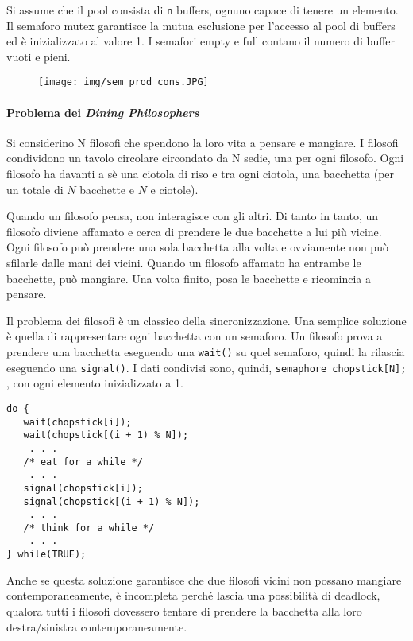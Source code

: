 \documentclass[a4]{article}
\begin{document}
Si assume che il pool consista di \texttt n buffers, ognuno capace di tenere un elemento. Il semaforo mutex garantisce la mutua esclusione per l'accesso al pool di buffers ed è inizializzato al valore 1. I semafori empty e full contano il numero di buffer vuoti e pieni.
\begin{figure}[h!]
    \texttt{[image: img/sem\_prod\_cons.JPG]}
\end{figure}

\paragraph{Problema dei \textit{Dining Philosophers}}

Si considerino N filosofi che spendono la loro vita a pensare e mangiare. I filosofi condividono un tavolo circolare circondato da N sedie, una per ogni filosofo. Ogni filosofo ha davanti a sè una ciotola di riso e tra ogni ciotola, una bacchetta (per un totale di $N$ bacchette e $N$ e ciotole).

Quando un filosofo pensa, non interagisce con gli altri. Di tanto in tanto, un filosofo diviene affamato e cerca di prendere le due bacchette a lui più vicine. Ogni filosofo può prendere una sola bacchetta alla volta e ovviamente non può sfilarle dalle mani dei vicini. Quando un filosofo affamato ha entrambe le bacchette, può mangiare. Una volta finito, posa le bacchette e ricomincia a pensare.

Il problema dei filosofi è un classico della sincronizzazione. Una semplice soluzione è quella di rappresentare ogni bacchetta con un semaforo. Un filosofo prova a prendere una bacchetta eseguendo una \texttt{wait()} su quel semaforo, quindi la rilascia eseguendo una \texttt{signal()}. I dati condivisi sono, quindi, \texttt{semaphore chopstick[N];} , con ogni elemento inizializzato a 1.
\begin{verbatim}
do {
   wait(chopstick[i]);
   wait(chopstick[(i + 1) % N]);
    . . .
   /* eat for a while */
    . . .
   signal(chopstick[i]);
   signal(chopstick[(i + 1) % N]);
    . . .
   /* think for a while */
    . . .
} while(TRUE);
\end{verbatim}

Anche se questa soluzione garantisce che due filosofi vicini non possano mangiare contemporaneamente, è incompleta perché lascia una possibilità di deadlock, qualora tutti i filosofi dovessero tentare di prendere la bacchetta alla loro destra/sinistra contemporaneamente.
\end{document}

